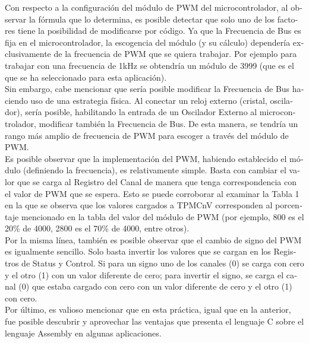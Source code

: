 \documentclass[journal]{IEEEtran}
\begin{document}
\begin{otherlanguage}{spanish}
Con respecto a la configuración del módulo de PWM del microcontrolador, al observar la fórmula que lo determina, es posible detectar que solo uno de los factores tiene la posibilidad de modificarse por código. Ya que la Frecuencia de Bus es fija en el microcontrolador, la escogencia del módulo (y su cálculo) dependería exclusivamente de la frecuencia de PWM que se quiera trabajar. Por ejemplo para trabajar con una frecuencia de 1kHz se obtendría un módulo de 3999 (que es el que se ha seleccionado para esta aplicación).\\

Sin embargo, cabe mencionar que sería posible modificar la Frecuencia de Bus haciendo uso de una estrategia física. Al conectar un reloj externo (cristal, oscilador), sería posible, habilitando la entrada de un Oscilador Externo al microcontrolador, modificar también la Frecuencia de Bus. De esta manera, se tendría un rango más amplio de frecuencia de PWM para escoger a través del módulo de PWM.\\

Es posible observar que la implementación del PWM, habiendo establecido el módulo (definiendo la frecuencia), es relativamente simple. Basta con cambiar el valor que se carga al Registro del Canal de manera que tenga correspondencia con el valor de PWM que se espera. Esto se puede corroborar al examinar la Tabla 1 en la que se observa que los valores cargados a TPMCnV corresponden al porcentaje mencionado en la tabla del valor del módulo de PWM (por ejemplo, 800 es el 20\% de 4000, 2800 es el 70\% de 4000, entre otros).\\

Por la misma línea, también es posible observar que el cambio de signo del PWM es igualmente sencillo. Solo basta invertir los valores que se cargan en los Registros de Status y Control. Si para un signo uno de los canales (0) se carga con cero y el otro (1) con un valor diferente de cero; para invertir el signo, se carga el canal (0) que estaba cargado con cero con un valor diferente de cero y el otro (1) con cero.\\

Por último, es valioso mencionar que en esta práctica, igual que en la anterior, fue posible descubrir y aprovechar las ventajas que presenta el lenguaje C sobre el lenguaje Assembly en algunas aplicaciones.


\end{otherlanguage}
\end{document}
